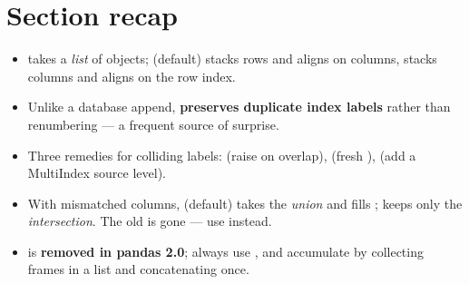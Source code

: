 \documentclass[11pt]{article}
\begin{document}
\section*{Section recap}
\begin{itemize}
  \item {} takes a \emph{list} of objects;  (default) stacks rows and aligns on columns,  stacks columns and aligns on the row index.
  \item Unlike a database append,  \textbf{preserves duplicate index labels} rather than renumbering --- a frequent source of surprise.
  \item Three remedies for colliding labels:  (raise on overlap),  (fresh ),  (add a MultiIndex source level).
  \item With mismatched columns,  (default) takes the \emph{union} and fills ;  keeps only the \emph{intersection}. The old  is gone --- use  instead.
  \item {} is \textbf{removed in pandas 2.0}; always use , and accumulate by collecting frames in a list and concatenating once.
\end{itemize}
\end{document}

